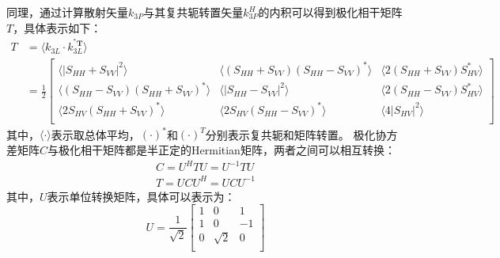 同理，通过计算散射矢量$k_{3P}$与其复共轭转置矢量$k_{3P}^{H}$的内积可以得到极化相干矩阵$T$，具体表示如下：
\begin{equation}
    \label{eq:T}
    \begin{aligned}
        T & =\left. \langle k_{3L}\cdot k_{3L}^{^*\boldsymbol{T}} \right. \rangle                                                                                                                                                                                                                  \\
          & =\frac{1}{2}\left[ \begin{matrix}
                                       \langle \left| S_{HH}+S_{VV} \right|^2\rangle                                               & \left. \langle \left( S_{HH}+S_{VV} \right) \left( S_{HH}-S_{VV} \right) ^* \right. \rangle & \left. \langle 2\left( S_{HH}+S_{VV} \right) S_{HV}^{*} \right. \rangle \\
                                       \left. \langle \left( S_{HH}-S_{VV} \right) \left( S_{HH}+S_{VV} \right) ^* \right. \rangle & \left. \langle \left| S_{HH}-S_{VV} \right|^2 \right. \rangle                               & \left. \langle 2\left( S_{HH}-S_{VV} \right) S_{HV}^{*} \right. \rangle \\
                                       \left. \langle 2S_{HV}\left( S_{HH}+S_{VV} \right) ^* \right. \rangle                       & \left. \langle 2S_{HV}\left( S_{HH}-S_{VV} \right) ^* \right. \rangle                       & \left. \langle 4\left| S_{HV} \right|^2 \right. \rangle                 \\
                                   \end{matrix} \right]
    \end{aligned}
\end{equation}
其中，$\langle \cdot \rangle$表示取总体平均，$(\cdot)^*$和$(\cdot)^T$分别表示复共轭和矩阵转置。
极化协方差矩阵$C$与极化相干矩阵都是半正定的Hermitian矩阵，两者之间可以相互转换：
\begin{gather}
    C=U^H T U=U^{-1} T U \\
    T=U C U^H=U C U^{-1}
\end{gather}
其中，$U$表示单位转换矩阵，具体可以表示为：
\begin{equation}
    U=\frac{1}{\sqrt{2}}\left[ \begin{matrix}
            1 & 0        & 1  \\
            1 & 0        & -1 \\
            0 & \sqrt{2} & 0  \\
        \end{matrix} \right]
\end{equation}


